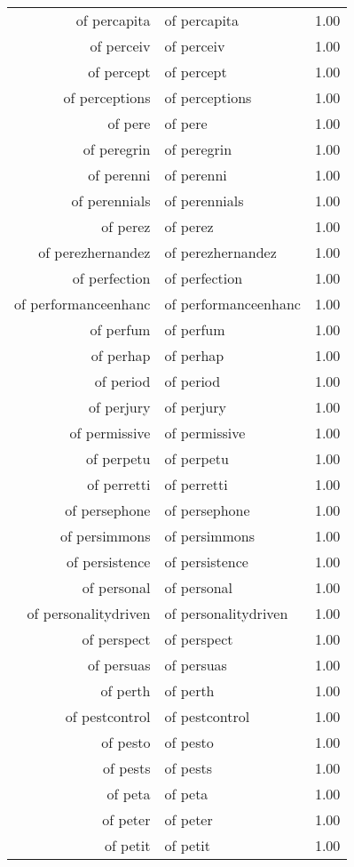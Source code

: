 \begin{table}[ht]
\begin{tabular}{rlr}
  of percapita & of percapita & 1.00 \\ 
  of perceiv & of perceiv & 1.00 \\ 
  of percept & of percept & 1.00 \\ 
  of perceptions & of perceptions & 1.00 \\ 
  of pere & of pere & 1.00 \\ 
  of peregrin & of peregrin & 1.00 \\ 
  of perenni & of perenni & 1.00 \\ 
  of perennials & of perennials & 1.00 \\ 
  of perez & of perez & 1.00 \\ 
  of perezhernandez & of perezhernandez & 1.00 \\ 
  of perfection & of perfection & 1.00 \\ 
  of performanceenhanc & of performanceenhanc & 1.00 \\ 
  of perfum & of perfum & 1.00 \\ 
  of perhap & of perhap & 1.00 \\ 
  of period & of period & 1.00 \\ 
  of perjury & of perjury & 1.00 \\ 
  of permissive & of permissive & 1.00 \\ 
  of perpetu & of perpetu & 1.00 \\ 
  of perretti & of perretti & 1.00 \\ 
  of persephone & of persephone & 1.00 \\ 
  of persimmons & of persimmons & 1.00 \\ 
  of persistence & of persistence & 1.00 \\ 
  of personal & of personal & 1.00 \\ 
  of personalitydriven & of personalitydriven & 1.00 \\ 
  of perspect & of perspect & 1.00 \\ 
  of persuas & of persuas & 1.00 \\ 
  of perth & of perth & 1.00 \\ 
  of pestcontrol & of pestcontrol & 1.00 \\ 
  of pesto & of pesto & 1.00 \\ 
  of pests & of pests & 1.00 \\ 
  of peta & of peta & 1.00 \\ 
  of peter & of peter & 1.00 \\ 
  of petit & of petit & 1.00 \\ 

\end{tabular}
\end{table}
